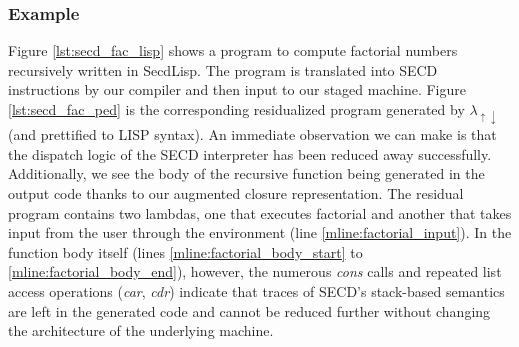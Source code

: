 \documentclass[a4paper,12pt,twoside,openright]{report}
\theoremstyle{definition}
\newcommand{\mslang}{$\lambda_{\uparrow\downarrow}$}
\newcommand{\secdlisp}{SecdLisp}
\begin{document}
\subsubsection{Example}
Figure \ref{lst:secd_fac_lisp} shows a program to compute factorial numbers recursively written in \secdlisp. The program is translated into SECD instructions by our compiler and then input to our staged machine. Figure \ref{lst:secd_fac_ped} is the corresponding residualized program generated by \mslang (and prettified to LISP syntax). An immediate observation we can make is that the dispatch logic of the SECD interpreter has been reduced away successfully. Additionally, we see the body of the recursive function being generated in the output code thanks to our augmented closure representation. The residual program contains two lambdas, one that executes factorial and another that takes input from the user through the environment (line \ref{mline:factorial_input}). In the function body itself (lines \ref{mline:factorial_body_start} to \ref{mline:factorial_body_end}), however, the numerous \textit{cons} calls and repeated list access operations (\textit{car}, \textit{cdr}) indicate that traces of SECD's stack-based semantics are left in the generated code and cannot be reduced further without changing the architecture of the underlying machine.
\end{document}

